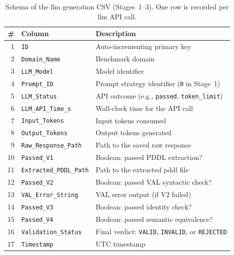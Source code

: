 \begin{table}[htbp]
  \centering
  \caption{Schema of the \gls{llm} generation CSV (Stages~1--3). One row is recorded per \gls{llm} API call.}
  \label{tab:llm_gen_csv}
  \small
  \begin{tabular}{r l p{7cm}}
    \toprule
    \textbf{\#} & \textbf{Column} & \textbf{Description} \\
    \midrule
    1 & \texttt{ID} & Auto-incrementing primary key \\
    2 & \texttt{Domain\_Name} & Benchmark domain \\
    3 & \texttt{LLM\_Model} & Model identifier \\
    4 & \texttt{Prompt\_ID} & Prompt strategy identifier (\texttt{0} in Stage~1) \\
    5 & \texttt{LLM\_Status} & API outcome (e.g., \texttt{passed}, \texttt{token\_limit}) \\
    6 & \texttt{LLM\_API\_Time\_s} & Wall-clock time for the API call \\
    7 & \texttt{Input\_Tokens} & Input tokens consumed \\
    8 & \texttt{Output\_Tokens} & Output tokens generated \\
    9 & \texttt{Raw\_Response\_Path} & Path to the saved raw response \\
    10 & \texttt{Passed\_V1} & Boolean: passed PDDL extraction? \\
    11 & \texttt{Extracted\_PDDL\_Path} & Path to the extracted \gls{pddl} file \\
    12 & \texttt{Passed\_V2} & Boolean: passed VAL syntactic check? \\
    13 & \texttt{VAL\_Error\_String} & VAL error output (if V2 failed) \\
    14 & \texttt{Passed\_V3} & Boolean: passed identity check? \\
    15 & \texttt{Passed\_V4} & Boolean: passed semantic equivalence? \\
    16 & \texttt{Validation\_Status} & Final verdict: \texttt{VALID}, \texttt{INVALID}, or \texttt{REJECTED} \\
    17 & \texttt{Timestamp} & UTC timestamp \\
    \bottomrule
  \end{tabular}
\end{table}

